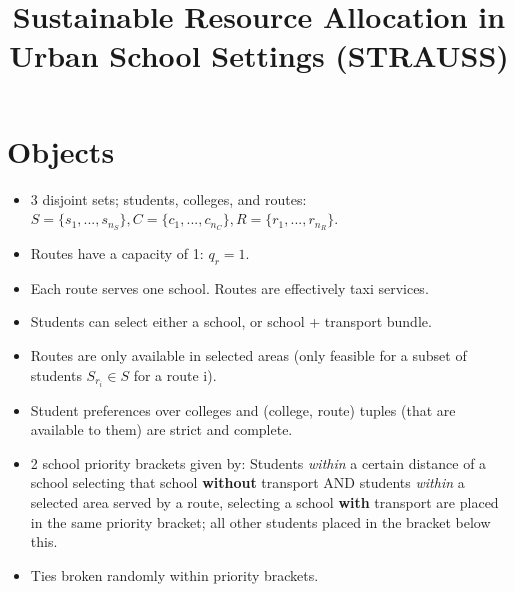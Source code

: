 \documentclass{article}
\title{Sustainable Resource Allocation in Urban School Settings (STRAUSS)}
\begin{document}
\maketitle

\section{Objects}
\begin{itemize}
    \item 3 disjoint sets; students, colleges, and routes:
    \subitem $S = \{s_1,...,s_{n_S}\}, C = \{c_1,...,c_{n_C}\}, R = \{r_1,...,r_{n_R}\}$.
    \item Routes have a capacity of 1: $q_r = 1$.
    \item Each route serves one school. Routes are effectively taxi services.
    \item Students can select either a school, or school + transport bundle.
    \item Routes are only available in selected areas (only feasible for a subset of students $S_{r_i} \in S$ for a route i).
    \item Student preferences over colleges and (college, route) tuples (that are available to them) are strict and complete.
    \item 2 school priority brackets given by:
    \subitem Students \textit{within} a certain distance of a school selecting that school \textbf{without} transport AND students \textit{within} a selected area served by a route, selecting a school \textbf{with} transport are placed in the same priority bracket; all other students placed in the bracket below this.
    \item Ties broken randomly within priority brackets.
\end{itemize}
\end{document}
